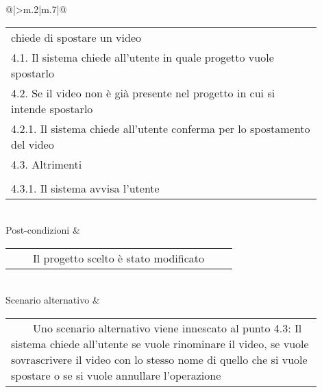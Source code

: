 \begin{table}[H]
\begin{longtable}{@{}|>{\centering\arraybackslash}m{.2\textwidth}|m{.7\textwidth}|@{}}
\begin{tabular}{m{0.9\linewidth}}
		chiede di spostare un video\\\hspace{0.5cm}\hspace{0.0cm}4.1. Il 
		sistema chiede all'utente in quale progetto vuole 
		spostarlo\\\hspace{0.5cm}\hspace{0.0cm}4.2. Se il video non è già 
		presente nel progetto in cui si intende 
		spostarlo\\\hspace{1.0cm}\hspace{0.5cm}\hspace{0.0cm}4.2.1. Il sistema 
		chiede all'utente conferma per lo spostamento del 
		video\\\hspace{0.5cm}\hspace{0.0cm}4.3. 
		Altrimenti\\\\\hspace{1.0cm}\hspace{0.5cm}\hspace{0.0cm}4.3.1. Il 
		sistema avvisa l'utente\\\end{tabular}\\
		Post-condizioni & \begin{tabular}{m{0.9\linewidth}}~~\llap{\textbullet}~~Il progetto scelto è stato modificato\\\end{tabular}\\
		Scenario alternativo & 
		\begin{tabular}{m{0.9\linewidth}}~~\llap{\textbullet}~~Uno scenario 
		alternativo viene innescato al punto 4.3: Il sistema chiede all'utente 
		se vuole rinominare il video, se vuole sovrascrivere il video con lo 
		stesso nome di quello che si vuole spostare o se si vuole annullare 
		l'operazione\\\end{tabular}\\\hline
		
	\end{longtable}
\end{table}

